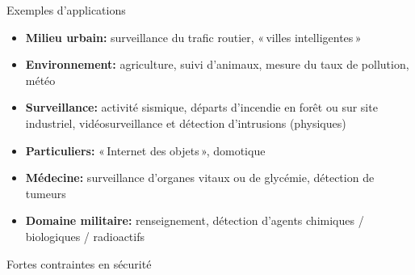 \documentclass[aspectratio=43]{beamer} %
\begin{document}
\begin{frame}{Exemples d'applications}
  \begin{small}
    \begin{itemize}
      \item \textbf{Milieu urbain:} surveillance du trafic routier, «\,villes intelligentes\,»
      \item \textbf{Environnement:} agriculture, suivi d'animaux, mesure du taux de pollution, météo
      \item \textbf{Surveillance:} activité sismique, départs d'incendie en forêt ou sur site industriel, vidéosurveillance et détection d'intrusions (physiques)
      \item \textbf{Particuliers:} «\,Internet des objets\,», domotique
      \item \textbf{\alert{Médecine}:} surveillance d'organes vitaux ou de glycémie, détection de tumeurs
      \item \textbf{Domaine \alert{militaire}:} renseignement, détection d'agents chimiques / biologiques / radioactifs
    \end{itemize}
  \end{small}
  Fortes contraintes en sécurité
\end{frame}
\end{document}
